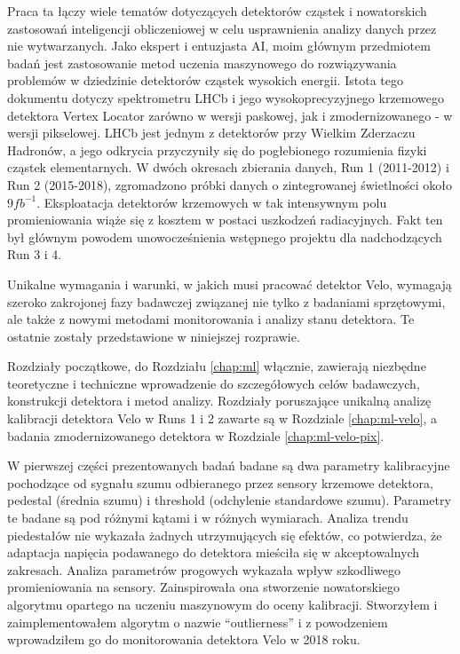 Praca ta łączy wiele tematów dotyczących detektorów cząstek i nowatorskich zastosowań inteligencji obliczeniowej w celu usprawnienia analizy danych przez nie wytwarzanych.
Jako ekspert i entuzjasta AI, moim głównym przedmiotem badań jest zastosowanie metod uczenia maszynowego do rozwiązywania problemów w dziedzinie detektorów cząstek wysokich energii.
Istota tego dokumentu dotyczy spektrometru LHCb i jego wysokoprecyzyjnego krzemowego detektora Vertex Locator zarówno w wersji paskowej, jak i zmodernizowanego - w wersji pikselowej.
LHCb jest jednym z detektorów przy Wielkim Zderzaczu Hadronów, a jego odkrycia przyczyniły się do pogłebionego rozumienia fizyki cząstek elementarnych.
W dwóch okresach zbierania danych, Run 1 (2011-2012) i Run 2 (2015-2018), zgromadzono próbki danych o zintegrowanej świetlności około $9fb^{-1}$. Eksploatacja detektorów krzemowych w tak intensywnym polu promieniowania wiąże się z kosztem w postaci uszkodzeń radiacyjnych. Fakt ten był głównym powodem unowocześnienia wstępnego projektu dla nadchodzących Run 3 i 4.


Unikalne wymagania i warunki, w jakich musi pracować detektor Velo, wymagają szeroko zakrojonej fazy badawczej związanej nie tylko z badaniami sprzętowymi, ale także z nowymi metodami monitorowania i analizy stanu detektora. Te ostatnie zostały przedstawione w niniejszej rozprawie.

Rozdziały początkowe, do Rozdziału \ref{chap:ml} włącznie, zawierają niezbędne teoretyczne i techniczne wprowadzenie do szczegółowych celów badawczych, konstrukcji detektora i metod analizy.
Rozdziały poruszające unikalną analizę kalibracji detektora Velo w Runs 1 i 2 zawarte są w Rozdziale \ref{chap:ml-velo}, a badania zmodernizowanego detektora w Rozdziale \ref{chap:ml-velo-pix}.

W pierwszej części prezentowanych badań badane są dwa parametry kalibracyjne pochodzące od sygnału szumu odbieranego przez sensory krzemowe detektora, pedestal (średnia szumu) i threshold (odchylenie standardowe szumu). Parametry te badane są pod różnymi kątami i w różnych wymiarach.
Analiza trendu piedestałów nie wykazała żadnych utrzymujących się efektów, co potwierdza, że adaptacja napięcia podawanego do detektora mieściła się w akceptowalnych zakresach.
Analiza parametrów progowych wykazała wpływ szkodliwego promieniowania na sensory. Zainspirowała ona stworzenie nowatorskiego algorytmu opartego na uczeniu maszynowym do oceny kalibracji.
Stworzyłem i zaimplementowałem algorytm o nazwie ``outlierness'' i z powodzeniem wprowadziłem go do monitorowania detektora Velo w 2018 roku.

